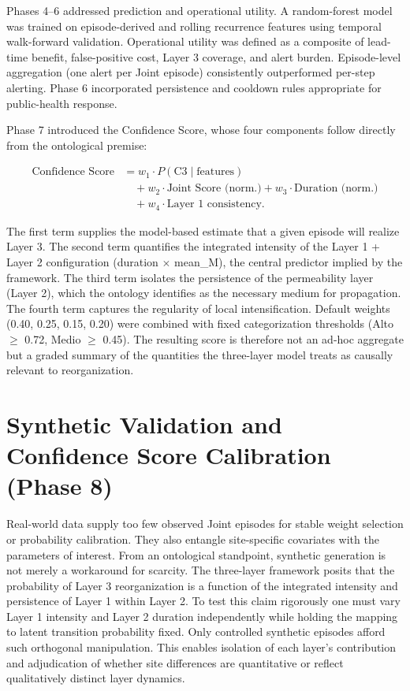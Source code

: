 \documentclass[11pt,a4paper]{article}
\begin{document}
Phases 4--6 addressed prediction and operational utility. A random-forest model was trained on episode-derived and rolling recurrence features using temporal walk-forward validation. Operational utility was defined as a composite of lead-time benefit, false-positive cost, Layer 3 coverage, and alert burden. Episode-level aggregation (one alert per Joint episode) consistently outperformed per-step alerting. Phase 6 incorporated persistence and cooldown rules appropriate for public-health response.

Phase 7 introduced the Confidence Score, whose four components follow directly from the ontological premise:
\begin{sloppypar}
\[
\begin{aligned}
\text{Confidence Score} &= w_1 \cdot P(\text{C3} \mid \text{features}) \\
&\quad + w_2 \cdot \text{Joint Score (norm.)} + w_3 \cdot \text{Duration (norm.)} \\
&\quad + w_4 \cdot \text{Layer 1 consistency}.
\end{aligned}
\]
\end{sloppypar}
The first term supplies the model-based estimate that a given episode will realize Layer 3. The second term quantifies the integrated intensity of the Layer 1 + Layer 2 configuration (duration \(\times\) mean\_M), the central predictor implied by the framework. The third term isolates the persistence of the permeability layer (Layer 2), which the ontology identifies as the necessary medium for propagation. The fourth term captures the regularity of local intensification. Default weights (0.40, 0.25, 0.15, 0.20) were combined with fixed categorization thresholds (Alto $\geq$ 0.72, Medio $\geq$ 0.45). The resulting score is therefore not an ad-hoc aggregate but a graded summary of the quantities the three-layer model treats as causally relevant to reorganization.

\section{Synthetic Validation and Confidence Score Calibration (Phase 8)}

Real-world data supply too few observed Joint episodes for stable weight selection or probability calibration. They also entangle site-specific covariates with the parameters of interest. From an ontological standpoint, synthetic generation is not merely a workaround for scarcity. The three-layer framework posits that the probability of Layer 3 reorganization is a function of the integrated intensity and persistence of Layer 1 within Layer 2. To test this claim rigorously one must vary Layer 1 intensity and Layer 2 duration independently while holding the mapping to latent transition probability fixed. Only controlled synthetic episodes afford such orthogonal manipulation. This enables isolation of each layer's contribution and adjudication of whether site differences are quantitative or reflect qualitatively distinct layer dynamics.
\end{document}
